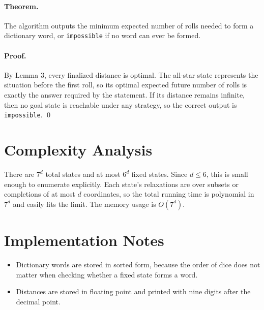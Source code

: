 \documentclass[11pt]{article}
\begin{document}
\paragraph{Theorem.}
The algorithm outputs the minimum expected number of rolls needed to form a dictionary word, or
\texttt{impossible} if no word can ever be formed.

\paragraph{Proof.}
By Lemma 3, every finalized distance is optimal. The all-star state represents the situation before the first
roll, so its optimal expected future number of rolls is exactly the answer required by the statement. If its
distance remains infinite, then no goal state is reachable under any strategy, so the correct output is
\texttt{impossible}. \qed

\section*{Complexity Analysis}

There are $7^d$ total states and at most $6^d$ fixed states. Since $d \le 6$, this is small enough to
enumerate explicitly. Each state's relaxations are over subsets or completions of at most $d$ coordinates,
so the total running time is polynomial in $7^d$ and easily fits the limit. The memory usage is $O(7^d)$.

\section*{Implementation Notes}

\begin{itemize}[leftmargin=*]
    \item Dictionary words are stored in sorted form, because the order of dice does not matter when
    checking whether a fixed state forms a word.
    \item Distances are stored in floating point and printed with nine digits after the decimal point.
\end{itemize}
\end{document}
